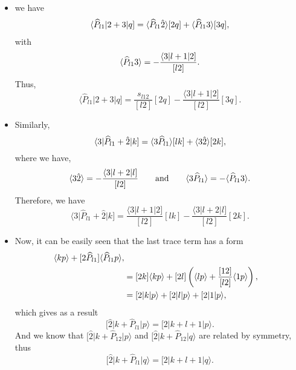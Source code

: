 \begin{itemize}
	\item we have
	\begin{align}
	\langle \widehat{P}_{l1} \vert 2+3\vert q] =\langle\widehat{P}_{l1} \hat{2}\rangle[2q]+\langle\widehat{P}_{l1}3\rangle[3q],
	\end{align}
	with
	\begin{equation}
	\langle\widehat{P}_{l1}3\rangle=-\frac{\langle 3\vert l+1\vert 2]}{[l2]}.
	\end{equation}
	Thus,
	\begin{equation}
	\langle \widehat{P}_{l1} \vert 2+3\vert q]=\frac{s_{l12}}{[l2]}[2q]-\frac{\langle 3\vert l+1\vert 2]}{[l2]}[3q].
	\end{equation}
	\item Similarly,
	\begin{equation}
	\langle 3\vert \widehat{P}_{l1} +\hat{2} \vert k]=\langle3\widehat{P}_{l1}\rangle [lk]+\langle3\hat{2}\rangle[2k],
	\end{equation}
	where we have,
	\begin{equation}
	\langle3\hat{2}\rangle=-\frac{\langle 3\vert l+2\vert l]}{[l2]} \qquad \text{and} \qquad \langle3\widehat{P}_{l1}\rangle=-\langle\widehat{P}_{l1}3\rangle.
	\end{equation}
	Therefore, we have 
	\begin{equation}
	\langle 3\vert \widehat{P}_{l1} +\hat{2} \vert k]=\frac{\langle 3\vert l+1\vert 2]}{[l2]} [lk]-\frac{\langle 3\vert l+2\vert l]}{[l2]}[2k] .
	\end{equation}
	\item Now, it can be easily seen that the last trace term has a form
	\begin{align}
	[\hat{2} \vert k+\widehat{P}_{l1} \vert p\rangle &=[2k] \braket{kp}+[2\widehat{P}_{l1}] \braket{\widehat{P}_{l1}p}, \nonumber \\
	&=[2k] \braket{kp}+[2l] \left( \braket{lp}+\frac{[12]}{[l2]}\braket{1p} \right), \nonumber \\
	&=[2\vert k\vert p\rangle +[2\vert l\vert p\rangle +[2\vert 1\vert p\rangle ,
	\end{align}
	which gives as a result
	\begin{equation}
	[\hat{2} \vert k+\widehat{P}_{l1} \vert p\rangle = [2\vert k+l+1\vert p\rangle .
	\end{equation}
	And we know that $[\hat{2} \vert k+\widehat{P}_{12} \vert p\rangle$ and $[\hat{2} \vert k+\widehat{P}_{12} \vert q\rangle$ are related by symmetry, thus
	\begin{equation}
	[\hat{2} \vert k+\widehat{P}_{l1} \vert q\rangle = [2\vert k+l+1\vert q\rangle .
	\end{equation}
\end{itemize}
